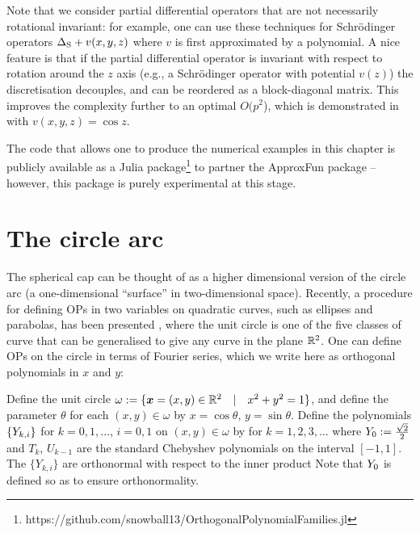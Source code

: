Note that we consider partial differential operators that are not necessarily rotational invariant: for example, one can use these techniques for Schr\"odinger operators $\Delta_{\rm S} + v(x,y,z)$ where $v$ is first approximated by a polynomial. A nice feature is that if the partial differential operator is invariant with respect to rotation around the $z$ axis (e.g., a Schr\"odinger operator with potential $v(z)$) the discretisation decouples, and can be reordered as a block-diagonal matrix. This improves the complexity further to an optimal $O(p^2$), which is demonstrated in  with $v(x,y,z) = \cos z$.

The code that allows one to produce the numerical examples in this chapter is publicly available as a Julia package\footnote{https://github.com/snowball13/OrthogonalPolynomialFamilies.jl} to partner the ApproxFun package \cite{ApproxFun} -- however, this package is purely experimental at this stage.




\section{The circle arc}\label{section:sc:arc}

The spherical cap can be thought of as a higher dimensional version of the circle arc (a one-dimensional \enquote{surface} in two-dimensional space). Recently, a procedure for defining OPs in two variables on quadratic curves, such as ellipses and parabolas, has been presented \cite{olver2021orthogonal}, where the unit circle is one of the five classes of curve that can be generalised to give any curve in the plane $\mathbb{R}^2$. One can define OPs on the circle in terms of Fourier series, which we write here as orthogonal polynomials in $x$ and $y$:
\begin{definition}\label{def:sc:Ydefinition}
	Define the unit circle $\omega := \{ \bm{x} = (x,y) \in \mathbb{R}^2 \quad | \quad x^2 + y^2 = 1 \}$, and define the parameter $\theta$ for each $(x,y) \in \omega$ by $x = \cos\theta$, $y = \sin\theta$. Define the polynomials $\{Y_{k,i}\}$ for $k = 0, 1, \dots$, $i = 0, 1$ on $(x,y) \in \omega$ by
for $k = 1,2,3,\dots$ where $Y_{0} := {\sqrt{2} \over 2}$ and $T_k$, $U_{k-1}$ are the standard Chebyshev polynomials on the interval $[-1,1]$. The $\{Y_{k,i}\}$ are orthonormal with respect to the inner product
Note that $Y_0$ is defined so as to ensure orthonormality. 
\end{definition}

